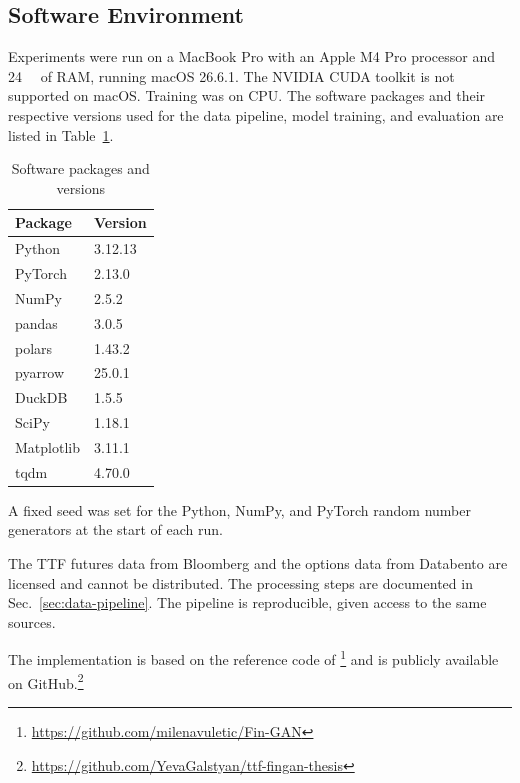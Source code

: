 \subsection{Software Environment}\label{sec:software}
Experiments were run on a MacBook Pro with an Apple M4 Pro processor and \SI{24}{\giga\byte} of RAM, running macOS 26.6.1. The NVIDIA CUDA toolkit is not supported on macOS. Training was on CPU. The software packages and their respective versions used for the data pipeline, model training, and evaluation are listed in Table~\ref{tab:software}.

\begin{table}[H]
\centering
\begin{tabular}{ll}
\toprule
Package & Version \\
\midrule
Python & 3.12.13 \\
PyTorch & 2.13.0 \\
NumPy & 2.5.2 \\
pandas & 3.0.5 \\
polars & 1.43.2 \\
pyarrow & 25.0.1 \\
DuckDB & 1.5.5 \\
SciPy & 1.18.1 \\
Matplotlib & 3.11.1 \\
tqdm & 4.70.0 \\
\bottomrule
\end{tabular}
\caption{Software packages and versions}
\label{tab:software}
\end{table}

A fixed seed was set for the Python, NumPy, and PyTorch random number
generators at the start of each run.

The TTF futures data from Bloomberg and the options data from Databento are licensed and cannot be distributed. The processing steps are documented in Sec.~\ref{sec:data-pipeline}. The pipeline is reproducible, given access to the same sources.

The implementation is based on the reference code of
\textcite{vuleticFinGANForecastingClassifying2024}\footnote{\url{https://github.com/milenavuletic/Fin-GAN}}
and is publicly available on
GitHub.\footnote{\url{https://github.com/YevaGalstyan/ttf-fingan-thesis}}